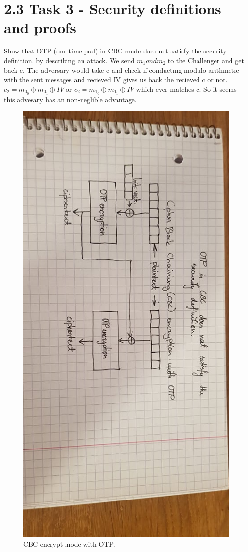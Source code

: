 \documentclass{article}
\begin{document}
\pagebreak
\section{2.3 Task 3 - Security definitions and proofs} 
Show that OTP (one time pad) in CBC mode does not satisfy the security definition, by describing an attack.
We send $m_1 and m_2$ to the Challenger and get back c. The adversary would take c and check if conducting modulo arithmetic
with the sent messages and recieved IV gives us back the recieved c or not.
$c_2 = m_{0_0} \oplus m_{0_1} \oplus IV$ or $c_2 = m_{1_0} \oplus m_{1_1} \oplus IV$ which ever matches c. So it seems 
this advesary has an non-neglible advantage.
\begin{figure}[H]
    \centering
    \label{fig:cbc_encrypt}
    \includegraphics[scale=0.5, angle=90]{cbc_enc.jpg}
    \caption{CBC encrypt mode with OTP.}
\end{figure}
\end{document}
